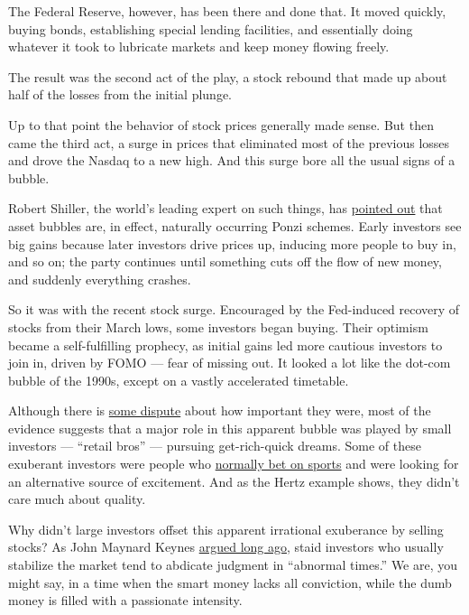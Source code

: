 The Federal Reserve, however, has been there and done that. It moved
quickly, buying bonds, establishing special lending facilities, and
essentially doing whatever it took to lubricate markets and keep money
flowing freely.

The result was the second act of the play, a stock rebound that made up
about half of the losses from the initial plunge.

Up to that point the behavior of stock prices generally made sense. But
then came the third act, a surge in prices that eliminated most of the
previous losses and drove the Nasdaq to a new high. And this surge bore
all the usual signs of a bubble.

Robert Shiller, the world's leading expert on such things, has
\href{https://www.jstor.org/stable/3216841?seq=1\#metadata_info_tab_contents}{pointed
out} that asset bubbles are, in effect, naturally occurring Ponzi
schemes. Early investors see big gains because later investors drive
prices up, inducing more people to buy in, and so on; the party
continues until something cuts off the flow of new money, and suddenly
everything crashes.

So it was with the recent stock surge. Encouraged by the Fed-induced
recovery of stocks from their March lows, some investors began buying.
Their optimism became a self-fulfilling prophecy, as initial gains led
more cautious investors to join in, driven by FOMO --- fear of missing
out. It looked a lot like the dot-com bubble of the 1990s, except on a
vastly accelerated timetable.

Although there is
\href{https://www.marketwatch.com/story/its-like-the-wild-west-in-the-stock-market-with-the-get-rich-crowd-vs-wall-st-pros-but-its-too-easy-to-blame-retail-investors-for-rampant-speculation-2020-06-13}{some
dispute} about how important they were, most of the evidence suggests
that a major role in this apparent bubble was played by small investors
--- ``retail bros'' --- pursuing get-rich-quick dreams. Some of these
exuberant investors were people who
\href{https://www.nytimes.com/2020/06/14/business/sports-gamblers-stocks-virus.html}{normally
bet on sports} and were looking for an alternative source of excitement.
And as the Hertz example shows, they didn't care much about quality.

Why didn't large investors offset this apparent irrational exuberance by
selling stocks? As John Maynard Keynes
\href{http://gutenberg.net.au/ebooks03/0300071h/chap12.html}{argued long
ago}, staid investors who usually stabilize the market tend to abdicate
judgment in ``abnormal times.'' We are, you might say, in a time when
the smart money lacks all conviction, while the dumb money is filled
with a passionate intensity.

